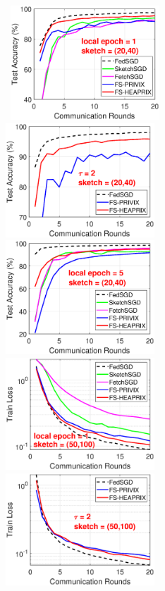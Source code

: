 \documentclass{article}
\begin{document}
\begin{figure}[H]
\begin{center}
		\mbox{\hspace{-0.15in}
		\includegraphics[width=2.2in]{MNIST_figures/local1_sketch20_iid1_test_acc.eps} \hspace{-0.15in}
		\includegraphics[width=2.2in]{MNIST_figures/local2_sketch20_iid1_test_acc.eps} \hspace{-0.15in}
		\includegraphics[width=2.2in]{MNIST_figures/local5_sketch20_iid1_test_acc.eps}\hspace{-0.15in}
		}
		\mbox{\hspace{-0.15in}	   
		\includegraphics[width=2.2in]{MNIST_figures/local1_sketch50_iid1_train_loss.eps} \hspace{-0.15in}
		\includegraphics[width=2.2in]{MNIST_figures/local2_sketch50_iid1_train_loss.eps} \hspace{-0.15in}
}
\end{center}
\end{figure}
\end{document}
